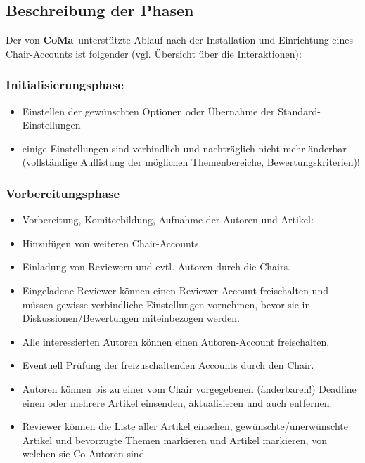 \documentclass[headexclude,footexclude,12pt,BCOR0pt,DIV15]{scrartcl}
\newcommand{\CoMa}{\textbf{CoMa}}
\begin{document}
    \subsection{Beschreibung der Phasen}
        Der von \CoMa\ unterst\"{u}tzte Ablauf nach der Installation und Einrichtung eines Chair-Accounts ist
        folgender (vgl. \"{U}bersicht \"{u}ber die Interaktionen):

        \subsubsection{Initialisierungsphase}
        \begin{itemize}
            \item Einstellen der gew\"{u}nschten Optionen oder \"{U}bernahme der Standard-Einstellungen
            \item einige Einstellungen sind verbindlich und nachtr\"{a}glich nicht mehr \"{a}nderbar (vollst\"{a}ndige
                Auflistung der m\"{o}glichen Themenbereiche, Bewertungskriterien)!
        \end{itemize}

        \subsubsection{Vorbereitungsphase}
        \begin{itemize}
            \item Vorbereitung, Komiteebildung, Aufnahme der Autoren und Artikel:
            \item Hinzuf\"{u}gen von weiteren Chair-Accounts.
            \item Einladung von Reviewern und evtl. Autoren durch die Chairs.
            \item Eingeladene Reviewer k\"{o}nnen einen Reviewer-Account freischalten und m\"{u}ssen gewisse
                  verbindliche Einstellungen vornehmen, bevor sie in Diskussionen/Bewertungen miteinbezogen
                  werden.
            \item Alle interessierten Autoren k\"{o}nnen einen Autoren-Account freischalten.
            \item Eventuell Pr\"{u}fung der freizuschaltenden Accounts durch den Chair.
            \item Autoren k\"{o}nnen bis zu einer vom Chair vorgegebenen (\"{a}nderbaren!) Deadline einen oder mehrere
                  Artikel einsenden, aktualisieren und auch entfernen.
            \item Reviewer k\"{o}nnen die Liste aller Artikel einsehen, gew\"{u}nschte/unerw\"{u}nschte Artikel und
                  bevorzugte Themen markieren und Artikel markieren, von welchen sie Co-Autoren sind.
        \end{itemize}
\end{document}
